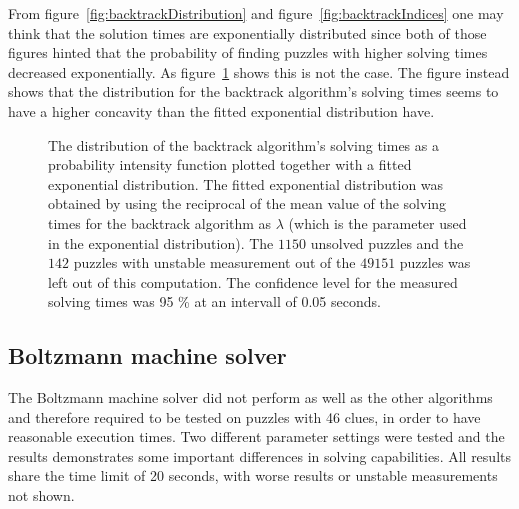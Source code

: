 \documentclass[a4paper,11pt]{kth-mag}
\begin{document}
\FloatBarrier
From figure~\ref{fig:backtrackDistribution} and figure~\ref{fig:backtrackIndices} one may think that the solution times are exponentially distributed since both of those figures hinted that the probability of finding puzzles with higher solving times decreased exponentially.
As figure~\ref{fig:backtrackExponential} shows this is not the case.
The figure instead shows that the distribution for the backtrack algorithm's solving times seems to have a higher concavity than the fitted exponential distribution have.

\begin{figure}[here] 
\noindent{}
\vspace{-15pt}
\caption{The distribution of the backtrack algorithm's solving times as a probability intensity function plotted together with a fitted exponential distribution. 
The fitted exponential distribution was obtained by using the reciprocal of the mean value of the solving times for the backtrack algorithm as $\lambda$ (which is the parameter used in the exponential distribution). 
The $1150$ unsolved puzzles and the $142$ puzzles with unstable measurement out of the $49151$ puzzles was left out of this computation. 
The confidence level for the measured solving times was 95 \% at an intervall of 0.05 seconds.}
\label{fig:backtrackExponential}
\end{figure}

\FloatBarrier
\subsection{Boltzmann machine solver}
The Boltzmann machine solver did not perform as well as the other algorithms and therefore required to be tested on puzzles with 46 clues, in order to have reasonable execution times.
Two different parameter settings were tested and the results demonstrates some important differences in solving capabilities.
All results share the time limit of 20 seconds, with worse results or unstable measurements not shown.
\end{document}
